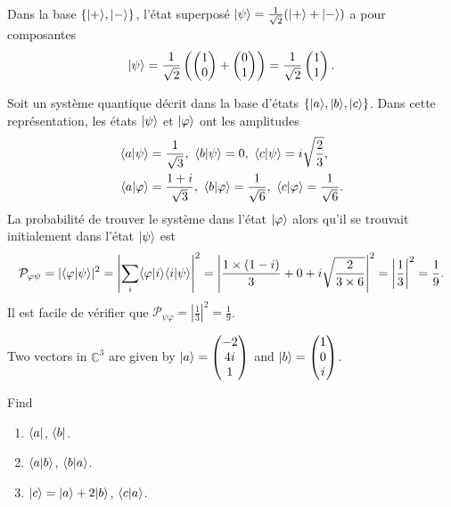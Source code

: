 \begin{example}
Dans la base $\{\vert+\rangle,\vert-\rangle\}$, l'état superposé $\vert\psi\rangle
=\frac{1}{\sqrt{2}}(\vert+\rangle+\vert-\rangle)$ a pour composantes
\begin{equation}
\vert\psi\rangle =\frac{1}{\sqrt{2}}\left(\begin{pmatrix}
1\\
0
\end{pmatrix}+\begin{pmatrix}
0\\
1
\end{pmatrix}\right)=\frac{1}{\sqrt{2}}\begin{pmatrix}
1\\
1
\end{pmatrix}.
\end{equation}
\end{example}

\begin{example}
Soit un système quantique décrit dans la base d'états $\{\vert a\rangle,\vert b\rangle,\vert c\rangle
\}$. Dans cette représentation, les états $\vert\psi\rangle $ et $\vert\varphi\rangle$ ont
les amplitudes
\begin{subequations}%
\begin{align}
\langle a\vert\psi\rangle  &  =\frac{1}{\sqrt{3}},~\langle b\vert\psi\rangle =0,~\langle
c\vert\psi\rangle=i\sqrt{\frac{2}{3}},\\
\langle a\vert\varphi\rangle &  =\frac{1+i}{\sqrt{3}},~\langle b\vert\varphi\rangle
=\frac{1}{\sqrt{6}},~\langle c\vert\varphi\rangle=\frac{1}{\sqrt{6}}.
\end{align}
\end{subequations}%
La probabilité de trouver le système dans l'état $\vert\varphi\rangle$ alors qu'il se
trouvait initialement dans l'état $\vert\psi\rangle$ est
\begin{equation}%
\mathcal{P}_{\varphi\psi} =|\langle\varphi\ket{\psi}|^{2}=\left|
\sum_{i}\langle\varphi\ket{i}\langle i\ket{\psi}\right|^{2}=\left|
\frac{1\times(1-i)}{3}+0+i\sqrt{\frac{2}{3\times6}}\right|^{2}=\left|
\frac{1}{3}\right|^{2}=\frac{1}{9}.
\end{equation}%
Il est facile de vérifier que $\mathcal{P}_{\psi\varphi} =|\frac{1}{3}|^{2}
=\frac{1}{9}$.
\end{example}

\begin{exercise}
 Two vectors in $\mathbb{C}^{3}$ are given by $\vert a\rangle=\begin{pmatrix}
-2\\
4i\\
1
\end{pmatrix}$ and $\vert b\rangle=\begin{pmatrix}
1\\
0\\
i
\end{pmatrix}$.

Find
\begin{enumerate}
 \item $\langle a\vert$, $\langle b\vert$.
 \item $\langle a\vert b\rangle$, $\langle b\vert a\rangle$.
 \item $\vert c\rangle=\vert a\rangle+2\vert b\rangle$, $\langle c\vert a\rangle$.
\end{enumerate}
\end{exercise}

